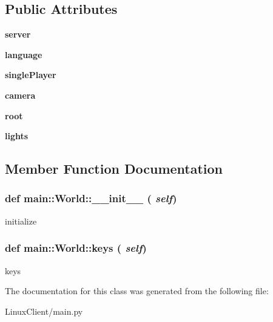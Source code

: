 \subsection*{Public Attributes}
\begin{DoxyCompactItemize}
\item 
\hypertarget{classmain_1_1World_aba84355e65530d70d70bbc24c58c8f3a}{
{\bfseries server}}
\label{classmain_1_1World_aba84355e65530d70d70bbc24c58c8f3a}

\item 
\hypertarget{classmain_1_1World_ad2e570baf54b35a277fc533effc2d406}{
{\bfseries language}}
\label{classmain_1_1World_ad2e570baf54b35a277fc533effc2d406}

\item 
\hypertarget{classmain_1_1World_a56107764d1bf252908769b5e2211d4a1}{
{\bfseries singlePlayer}}
\label{classmain_1_1World_a56107764d1bf252908769b5e2211d4a1}

\item 
\hypertarget{classmain_1_1World_abf55c9152711a95d5947a4a222ff82d3}{
{\bfseries camera}}
\label{classmain_1_1World_abf55c9152711a95d5947a4a222ff82d3}

\item 
\hypertarget{classmain_1_1World_a04a2b7eb2d7ff54308d76e30f8551e9b}{
{\bfseries root}}
\label{classmain_1_1World_a04a2b7eb2d7ff54308d76e30f8551e9b}

\item 
\hypertarget{classmain_1_1World_a7886b263ba0f32c46c618cb51af7c77c}{
{\bfseries lights}}
\label{classmain_1_1World_a7886b263ba0f32c46c618cb51af7c77c}

\end{DoxyCompactItemize}


\subsection{Member Function Documentation}
\hypertarget{classmain_1_1World_ac3410c22682621f6871ac8335cd7ea4c}{
\subsubsection[{\_\-\_\-init\_\-\_\-}]{\setlength{\rightskip}{0pt plus 5cm}def main::World::\_\-\_\-init\_\-\_\- ( {\em self})}}
\label{classmain_1_1World_ac3410c22682621f6871ac8335cd7ea4c}
\begin{DoxyVerb}initialize\end{DoxyVerb}
 \hypertarget{classmain_1_1World_a19bea80571776e75d868e8003290f329}{
\subsubsection[{keys}]{\setlength{\rightskip}{0pt plus 5cm}def main::World::keys ( {\em self})}}
\label{classmain_1_1World_a19bea80571776e75d868e8003290f329}
\begin{DoxyVerb}keys\end{DoxyVerb}
 

The documentation for this class was generated from the following file:\begin{DoxyCompactItemize}
\item 
LinuxClient/main.py\end{DoxyCompactItemize}
